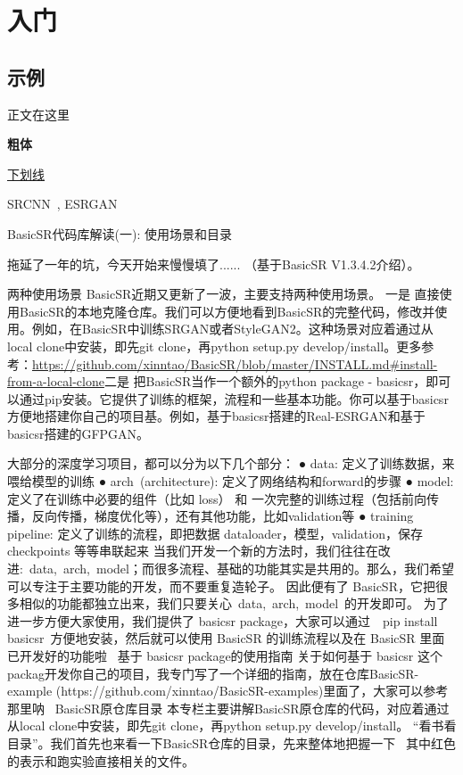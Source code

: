 \documentclass[../main.tex]{subfiles}
\begin{document}
\chapter{入门}

\section{示例}

正文在这里

\textbf{粗体}

\uline{下划线}


SRCNN~\cite{dong2014learning}, ESRGAN~\cite{wang2018esrgan}

BasicSR代码库解读(一): 使用场景和目录

拖延了一年的坑，今天开始来慢慢填了......  （基于BasicSR V1.3.4.2介绍）。

两种使用场景
BasicSR近期又更新了一波，主要支持两种使用场景。
一是 直接使用BasicSR的本地克隆仓库。我们可以方便地看到BasicSR的完整代码，修改并使用。例如，在BasicSR中训练SRGAN或者StyleGAN2。这种场景对应着通过从local clone中安装，即先git clone，再python setup.py develop/install。更多参考：\url{https://github.com/xinntao/BasicSR/blob/master/INSTALL.md#install-from-a-local-clone}二是 把BasicSR当作一个额外的python package - basicsr，即可以通过pip安装。它提供了训练的框架，流程和一些基本功能。你可以基于basicsr方便地搭建你自己的项目基。例如，基于basicsr搭建的Real-ESRGAN和基于basicsr搭建的GFPGAN。

大部分的深度学习项目，都可以分为以下几个部分：
● data: 定义了训练数据，来喂给模型的训练
● arch (architecture): 定义了网络结构和forward的步骤
● model: 定义了在训练中必要的组件（比如 loss） 和 一次完整的训练过程（包括前向传播，反向传播，梯度优化等），还有其他功能，比如validation等
● training pipeline: 定义了训练的流程，即把数据 dataloader，模型，validation，保存 checkpoints 等等串联起来
当我们开发一个新的方法时，我们往往在改进: data, arch, model；而很多流程、基础的功能其实是共用的。那么，我们希望可以专注于主要功能的开发，而不要重复造轮子。
因此便有了 BasicSR，它把很多相似的功能都独立出来，我们只要关心 data, arch, model 的开发即可。
为了进一步方便大家使用，我们提供了 basicsr package，大家可以通过  pip install basicsr 方便地安装，然后就可以使用 BasicSR 的训练流程以及在 BasicSR 里面已开发好的功能啦~
基于 basicsr package的使用指南
关于如何基于 basicsr 这个packag开发你自己的项目，我专门写了一个详细的指南，放在仓库BasicSR-example (https://github.com/xinntao/BasicSR-examples)里面了，大家可以参考那里呐~
BasicSR原仓库目录
本专栏主要讲解BasicSR原仓库的代码，对应着通过从local clone中安装，即先git clone，再python setup.py develop/install。
“看书看目录”。我们首先也来看一下BasicSR仓库的目录，先来整体地把握一下~ 其中红色的表示和跑实验直接相关的文件。
\end{document}
